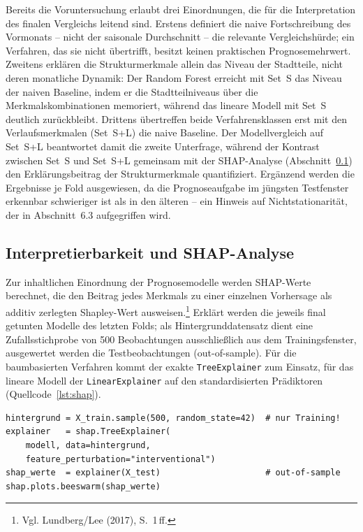 Bereits die Voruntersuchung erlaubt drei Einordnungen, die für die
Interpretation des finalen Vergleichs leitend sind. Erstens definiert die
naive Fortschreibung des Vormonats -- nicht der saisonale Durchschnitt --
die relevante Vergleichshürde; ein Verfahren, das sie nicht übertrifft,
besitzt keinen praktischen Prognosemehrwert. Zweitens erklären die
Strukturmerkmale allein das Niveau der Stadtteile, nicht deren monatliche
Dynamik: Der Random Forest erreicht mit Set~S das Niveau der naiven
Baseline, indem er die Stadtteilniveaus über die Merkmalskombinationen
memoriert, während das lineare Modell mit Set~S deutlich zurückbleibt.
Drittens übertreffen beide Verfahrensklassen erst mit den
Verlaufsmerkmalen (Set~S+L) die naive Baseline. Der Modellvergleich auf
Set~S+L beantwortet damit die zweite Unterfrage, während der Kontrast
zwischen Set~S und Set~S+L gemeinsam mit der SHAP-Analyse
(Abschnitt~\ref{sec:shap}) den Erklärungsbeitrag der Strukturmerkmale
quantifiziert. Ergänzend werden die Ergebnisse je Fold ausgewiesen, da die
Prognoseaufgabe im jüngsten Testfenster erkennbar schwieriger ist als in den
älteren -- ein Hinweis auf Nichtstationarität, der in Abschnitt~6.3
aufgegriffen wird.

\subsection{Interpretierbarkeit und SHAP-Analyse}
\label{sec:shap}

Zur inhaltlichen Einordnung der Prognosemodelle werden SHAP-Werte
berechnet, die den Beitrag jedes Merkmals zu einer einzelnen Vorhersage als
additiv zerlegten Shapley-Wert ausweisen.\footnote{Vgl. Lundberg/Lee (2017),
S.~1\,ff.} Erklärt werden die jeweils final getunten Modelle des letzten
Folds; als Hintergrunddatensatz dient eine Zufallsstichprobe von 500
Beobachtungen ausschließlich aus dem Trainingsfenster, ausgewertet werden
die Testbeobachtungen (out-of-sample). Für die baumbasierten Verfahren kommt
der exakte \texttt{TreeExplainer} zum Einsatz, für das lineare Modell der
\texttt{LinearExplainer} auf den standardisierten Prädiktoren
(Quellcode~\ref{lst:shap}).

\begin{lstlisting}[caption={SHAP-Berechnung für das getunte
XGBoost-Modell (Ausschnitt aus \texttt{modellierung/shap\_analyse.py})},
label=lst:shap]
hintergrund = X_train.sample(500, random_state=42)  # nur Training!
explainer   = shap.TreeExplainer(
    modell, data=hintergrund,
    feature_perturbation="interventional")
shap_werte  = explainer(X_test)                     # out-of-sample
shap.plots.beeswarm(shap_werte)
\end{lstlisting}


